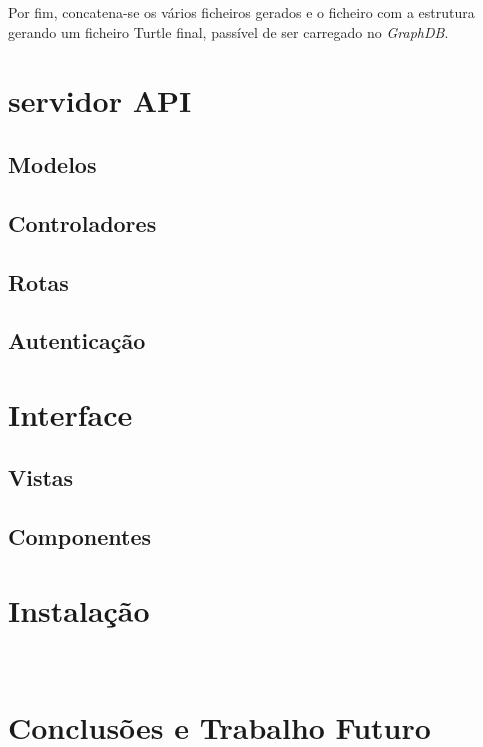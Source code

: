 \documentclass{article}
\begin{document}
Por fim, concatena-se os vários ficheiros gerados e o ficheiro com a estrutura gerando um ficheiro Turtle final, passível de ser carregado no \textit{GraphDB}.

\section{servidor API}


\subsection{Modelos}

\subsection{Controladores}

\subsection{Rotas}

\subsection{Autenticação}

\section{Interface}


\subsection{Vistas}

\subsection{Componentes}

\section{Instalação}

~\cite{mbAnnotation}

\section{Conclusões e Trabalho Futuro}
\end{document}
